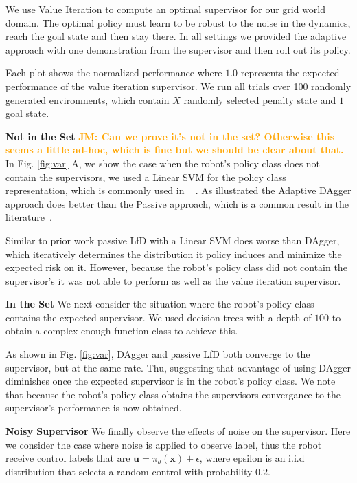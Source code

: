 \documentclass[10pt, conference]{ieeeconf}      %
\newcommand{\bu}{\mathbf{u}}
\newcommand{\bx}{\mathbf{x}}
\newcommand{\jmnote}[1]{%
 {\textcolor{orange}{\textbf{JM: #1}}}{}}
\begin{document}
We use Value Iteration to compute an optimal supervisor for our grid world domain. The optimal policy must learn to be robust to the noise in the dynamics, reach the goal state and then stay there. In all settings we provided the adaptive approach with one demonstration from the supervisor and then roll out its policy. 

Each plot shows the normalized performance where $1.0$ represents the expected performance of the value iteration supervisor. We run all trials over 100 randomly generated environments, which contain $X$ randomly selected penalty state and $1$ goal state. 


\noindent \textbf{Not in the Set} \jmnote{Can we prove it's not in the set? Otherwise this seems a little ad-hoc, which is fine but we should be clear about that.}
In Fig. \ref{fig:var} A, we show the case when the robot's policy class does not contain the supervisors, we used a Linear SVM for the policy class representation, which is commonly used in ~\cite{ross2010efficient,ross2010reduction,ross2013learning} . As illustrated the Adaptive DAgger approach does better than the Passive approach, which is a common result in the literature~\cite{ross2010efficient,ross2010reduction}.


Similar to prior work passive LfD  with a Linear SVM does worse than DAgger, which iteratively determines the distribution it policy induces and minimize the expected risk on it. However, because the robot's policy class did not contain the supervisor's it was not able to perform as well as the value iteration supervisor. 

\noindent \textbf{In the Set}
We next consider the situation where the robot's policy class contains the expected supervisor. We used decision trees with a depth of $100$ to obtain a complex enough function class to achieve this. 

As shown in Fig. \ref{fig:var}, DAgger and passive LfD both converge to the supervisor, but at the same rate. Thu, suggesting that advantage of using DAgger diminishes once the expected supervisor is in the robot's policy class. We note that because the robot's policy class obtains the supervisors convergance to the supervisor's performance is now obtained. 




\noindent \textbf{Noisy Supervisor}
We finally observe the effects of noise on the supervisor. Here we consider the case where noise is applied to observe label, thus the robot receive control labels that are $\bu = \pi_{\theta}(\bx) + \epsilon$,  where epsilon is an i.i.d distribution that selects a random control with probability $0.2$.
\end{document}
